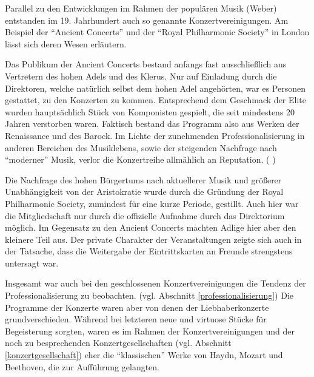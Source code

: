 \documentclass[a4paper, german, oneside]{scrbook}
\begin{document}
Parallel zu den Entwicklungen im Rahmen der populären Musik (Weber) entstanden im 19. Jahrhundert auch so genannte Konzertvereinigungen. Am Beispiel der \enquote{Ancient Concerts} und der \enquote{Royal Philharmonic Society} in London lässt sich deren Wesen erläutern.

Das Publikum der Ancient Concerts bestand anfangs fast ausschließlich aus Vertretern des hohen Adels und des Klerus. Nur auf Einladung durch die Direktoren, welche natürlich selbst dem hohen Adel angehörten, war es Personen gestattet, zu den Konzerten zu kommen. Entsprechend dem Geschmack der Elite wurden hauptsächlich Stück von Komponisten gespielt, die seit mindestens 20 Jahren verstorben waren. Faktisch bestand das Programm also aus Werken der Renaissance und des Barock. Im Lichte der zunehmenden Professionalisierung in anderen Bereichen des Musiklebens, sowie der steigenden Nachfrage nach \enquote{moderner} Musik, verlor die Konzertreihe allmählich an Reputation. (\cite[92ff.;]{muller_publikum_2014} \cite[73]{weber_music_2004})

Die Nachfrage des hohen Bürgertums nach aktuellerer Musik und größerer Unabhängigkeit von der Aristokratie wurde durch die Gründung der Royal Philharmonic Society, zumindest für eine kurze Periode, gestillt. Auch hier war die Mitgliedschaft nur durch die offizielle Aufnahme durch das Direktorium möglich. Im Gegensatz zu den Ancient Concerts machten Adlige hier aber den kleinere Teil aus. Der private Charakter der Veranstaltungen zeigte sich auch in der Tatsache, dass die Weitergabe der Eintrittskarten an Freunde strengstens untersagt war. \parencite[vgl.][93]{muller_publikum_2014}

Insgesamt war auch bei den geschlossenen Konzertvereinigungen die Tendenz der Professionalisierung zu beobachten. (vgl. Abschnitt \ref{professionalisierung}) Die Programme der Konzerte waren aber von denen der Liebhaberkonzerte grundverschieden. Während bei letzteren neue und virtuose Stücke für Begeisterung sorgten, waren es im Rahmen der Konzertvereinigungen und der noch zu besprechenden Konzertgesellschaften (vgl. Abschnitt \ref{konzertgesellschaft}) eher die \enquote{klassischen} Werke von Haydn, Mozart und Beethoven, die zur Aufführung gelangten. \parencite[vgl.][22f]{weber_music_2004}
\end{document}
